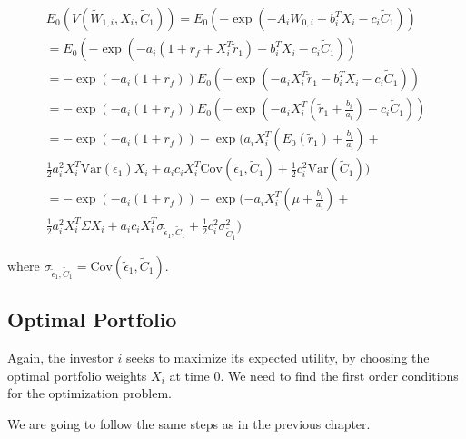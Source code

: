 \begin{equation}
    \begin{aligned}
        E_0(V(\tilde{W}_{1,i}, X_i, \tilde{C}_1)) = E_0(-\exp{(-A_i W_{0,i} - b_i^T X_i - c_i \tilde{C}_1)}) \\
       = E_0(-\exp{(-a_i(1 + r_f + X_i^T \tilde{r}_1) - b_i^T X_i - c_i \tilde{C}_1)}) \\
       = -\exp{(-a_i(1 + r_f))} E_0(-\exp{(-a_i X_i^T \tilde{r}_1 - b_i^T X_i - c_i \tilde{C}_1)}) \\
       = -\exp{(-a_i(1 + r_f))} E_0(-\exp{(-a_i X_i^T(\tilde{r}_1 + \frac{b_i}{a_i}) - c_i \tilde{C}_1)}) \\
       = -\exp{(-a_i(1 + r_f))} -\exp(a_i X_i^T(E_0(\tilde{r}_1)+\frac{b_i}{a_i}) +\\
       \frac{1}{2}a^2_i X_i^T \text{Var}(\tilde{\epsilon}_1)X_i + a_i c_i X_i^T \text{Cov}(\tilde{\epsilon}_1, \tilde{C}_1) + \frac{1}{2}c_i^2 \text{Var}(\tilde{C}_1)) \\
       = -\exp(-a_i(1 + r_f)) - \exp(-a_i X_i^T(\mu + \frac{b_i}{a_i}) + \\
       \frac{1}{2}a_i^2 X_i^T \Sigma X_i + a_i c_i X_i^T \sigma_{\tilde{\epsilon}_1, \tilde{C}_1} + \frac{1}{2}c_i^2 \sigma^2_{\tilde{C}_1})
    \end{aligned}
\end{equation}

where $\sigma_{\tilde{\epsilon}_1, \tilde{C}_1} = \text{Cov}(\tilde{\epsilon}_1, \tilde{C}_1)$.

\subsection{Optimal Portfolio}

Again, the investor $i$ seeks to maximize its expected utility,
by choosing the optimal portfolio weights $X_i$ at time 0.
We need to find the first order conditions for the optimization problem.

We are going to follow the same steps as in the previous chapter. 


